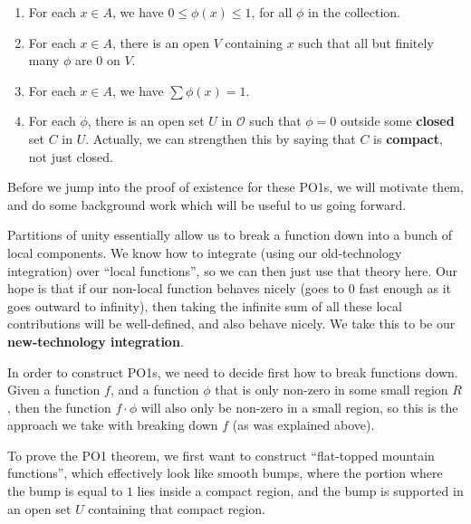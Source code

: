 \documentclass[10pt, oneside]{amsart}
\begin{document}
    \begin{enumerate}
    \item For each $x \in A$, we have $0 \leq \phi(x) \leq 1$, for all $\phi$ in the collection.
    \item For each $x \in A$, there is an open $V$ containing $x$ such that all but finitely many $\phi$ are $0$ on $V$.
    \item For each $x \in A$, we have $\sum \phi(x) = 1$.
    \item For each $\phi$, there is an open set $U$ in $\mathcal{O}$ such that $\phi = 0$ outside some \textbf{closed} set $C$ in $U$. Actually,
      we can strengthen this by saying that $C$ is \textbf{compact}, not just closed.
    \end{enumerate}

    Before we jump into the proof of existence for these PO1s, we will motivate them, and do some background work which will
    be useful to us going forward.

    \hrulefill

    Partitions of unity essentially allow us to break a function down into a bunch of local components. We know how to integrate (using our old-technology integration) over ``local functions'', so we can then just use that theory here. Our hope is that if our non-local function behaves nicely (goes to $0$ fast enough as it goes outward to infinity), then taking the infinite sum of all these local contributions will be well-defined, and also behave nicely. We take this to be our \textbf{new-technology integration}.

    \hrulefill

    In order to construct PO1s, we need to decide first how to break functions down. Given a function $f$, and a function $\phi$ that is only non-zero in some small region $R$, then the function $f \cdot \phi$ will also only be non-zero in a small region, so this is the approach we take with breaking down $f$ (as was explained above).
    \newline

    To prove the PO1 theorem, we first want to construct ``flat-topped mountain functions'', which effectively look like smooth bumps, where
    the portion where the bump is equal to $1$ lies inside a compact region, and the bump is supported in an open set $U$ containing that compact region.
\end{document}
